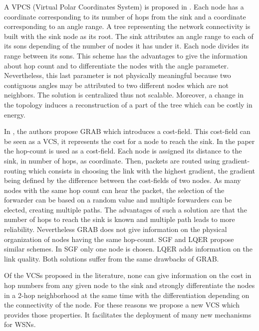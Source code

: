 \documentclass[a4paper]{article}
\begin{document}
A VPCS (Virtual Polar Coordinates System) is proposed in \cite{Newsome03}. Each node has a coordinate corresponding to its number of hops from the sink and a coordinate corresponding to an angle range. A tree representing the network connectivity is built with the sink node as its root. The sink attributes an angle range to each of its sons depending of the number of nodes it has under it. Each node divides its range between its sons. This scheme has the advantages to give the information about hop count and to differentiate the nodes with the angle parameter. Nevertheless, this last parameter is not physically meaningful because two contiguous angles may be attributed to two different nodes which are not neighbors. The solution is centralized thus not scalable. Moreover, a change in the topology induces a reconstruction of a part of the tree which can be costly in energy.

In \cite{Ye05}, the authors propose GRAB which introduces a cost-field. This cost-field can be seen as a VCS, it represents the cost for a node to reach the sink. In the paper the hop-count is used as a cost-field. Each node is assigned its distance to the sink, in number of hops, as coordinate. Then, packets are routed using gradient-routing which consists in choosing the link with the highest gradient, the gradient being defined by the difference between the cost-fields of two nodes. As many nodes with the same hop count can hear the packet, the selection of the forwarder can be based on a random value and multiple forwarders can be elected, creating multiple paths. The advantages of such a solution are that the number of hops to reach the sink is known and multiple path leads to more reliability. Nevertheless GRAB does not give information on the physical organization of nodes having the same hop-count. SGF \cite{Huang09} and LQER \cite{Chen08} propose similar schemes. In SGF only one node is chosen. LQER adds information on the link quality. Both solutions suffer from the same drawbacks of GRAB.


Of the VCSs proposed in the literature, none can give information on the cost in hop numbers from any given node to the sink and strongly differentiate the nodes in a 2-hop neighborhood at the same time with the differentiation depending on the connectivity of the node. For these reasons we propose a new VCS which provides those properties. It facilitates the deployment of many new mechanisms for WSNs.
\end{document}
